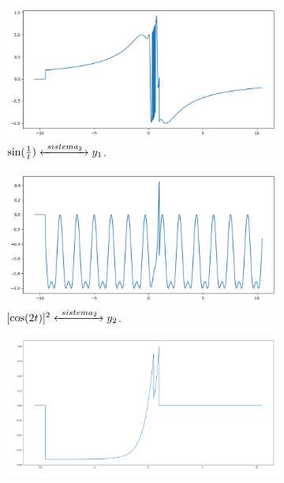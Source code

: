 \begin{figure}[H] 
    \begin{subfigure}[b]{0.5\linewidth}
        \centering
        \includegraphics[width=1\linewidth]{prints/exemplo_1.png}
        \caption{\( \sin(\frac{1}{t}) \xleftrightarrow[]{\ sistema_2\ } y_1\).} 
        \label{fig:exemplo1} 
    \end{subfigure}%
    \begin{subfigure}[b]{0.5\linewidth}
        \centering
        \includegraphics[width=1\linewidth]{prints/exemplo_2.png} 
        \caption{\( [\cos(2t)]^2 \xleftrightarrow[]{\ sistema_2\ } y_2\).} 
        \label{fig:exemplo2} 
    \end{subfigure} 
        \begin{subfigure}[b]{0.5\linewidth}
        \centering
        \includegraphics[width=1\linewidth]{prints/exemplo_3.png}

\end{subfigure}
\end{figure}
